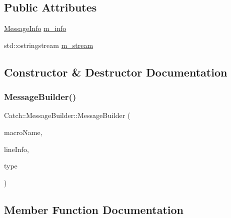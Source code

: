 \subsection*{Public Attributes}
\begin{DoxyCompactItemize}
\item 
\hyperlink{struct_catch_1_1_message_info}{Message\+Info} \hyperlink{struct_catch_1_1_message_builder_a979f1c2b36d78f80ee275bfa5ba0209f}{m\+\_\+info}
\item 
std\+::ostringstream \hyperlink{struct_catch_1_1_message_builder_a6488ab0cc4ea52affc9c0612c7c5df6b}{m\+\_\+stream}
\end{DoxyCompactItemize}


\subsection{Constructor \& Destructor Documentation}
\hypertarget{struct_catch_1_1_message_builder_ab0c6378e722680bf58852c6ee2b6e724}{}\label{struct_catch_1_1_message_builder_ab0c6378e722680bf58852c6ee2b6e724} 
\subsubsection{\texorpdfstring{Message\+Builder()}{MessageBuilder()}}
{\footnotesize\ttfamily Catch\+::\+Message\+Builder\+::\+Message\+Builder (\begin{DoxyParamCaption}\item[{std\+::string const \&}]{macro\+Name,  }\item[{\hyperlink{struct_catch_1_1_source_line_info}{Source\+Line\+Info} const \&}]{line\+Info,  }\item[{\hyperlink{struct_catch_1_1_result_was_a624e1ee3661fcf6094ceef1f654601ef}{Result\+Was\+::\+Of\+Type}}]{type }\end{DoxyParamCaption})\hspace{0.3cm}{\ttfamily [inline]}}



\subsection{Member Function Documentation}
\hypertarget{struct_catch_1_1_message_builder_a20fa48d069b20dddcc2d3df8abb123c1}{}\label{struct_catch_1_1_message_builder_a20fa48d069b20dddcc2d3df8abb123c1} 
